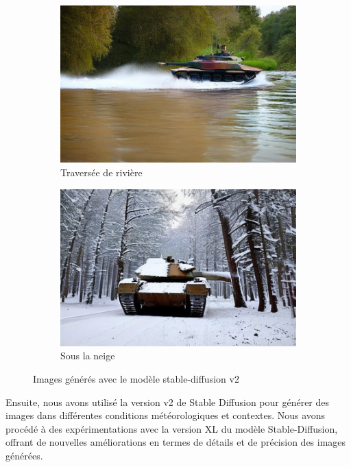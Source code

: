 \begin{figure}[H]
\begin{subfigure}[b]{0.49\textwidth}
        \centering
        \includegraphics[width=\textwidth]{./images/v2_tank-river_crossing-0.png}
        \caption{Traversée de rivière}
    \end{subfigure}
    \begin{subfigure}[b]{0.49\textwidth}
        \centering
        \includegraphics[width=\textwidth]{./images/v2_tank-snow-1.png}
        \caption{Sous la neige}
    \end{subfigure}
    \caption{Images générés avec le modèle stable-diffusion v2}
    \label{fig:image_sdv2}
\end{figure}


Ensuite, nous avons utilisé la version v2 de Stable Diffusion pour générer des images dans différentes conditions météorologiques et contextes.
Nous avons procédé à des expérimentations avec la version XL du modèle Stable-Diffusion, offrant de nouvelles améliorations en termes de détails et de précision des images générées.

